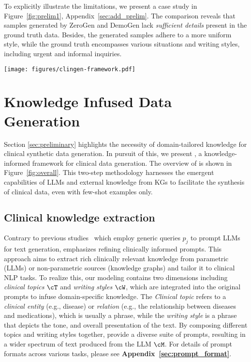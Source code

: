 To explicitly illustrate the limitations, we present a case study in Figure~\ref{fig:prelim1},  Appendix~\ref{sec:add_prelim}. 
The comparison reveals that samples generated by ZeroGen and DemoGen lack  \textit{sufficient details} present in the ground truth data. 
Besides, the generated samples adhere to a more uniform style, while the ground truth encompasses various situations and writing styles, including urgent and informal inquiries.

\begin{figure*}[t]
    \centering
    \texttt{[image: figures/clingen-framework.pdf]}
    \caption{The overview of \ours. \vspace{-2ex}
    }
    \label{fig:overall}
\end{figure*}
\section{Knowledge Infused Data Generation}
Section \ref{sec:preliminary} highlights the necessity of domain-tailored knowledge for clinical synthetic data generation. In pursuit of this, we present {\ours}, a knowledge-informed framework for clinical data generation. The overview of {\ours} is shown in Figure~\ref{fig:overall}. 
This two-step methodology harnesses the emergent capabilities of LLMs and external knowledge from KGs to facilitate the synthesis of clinical data, even with few-shot examples only.  

\subsection{Clinical knowledge extraction}
Contrary to previous studies~\citep{ye2022zerogen,ye2022progen,meng2023tuning} which employ generic queries $p_j$ to prompt LLMs for text generation, {\ours} emphasizes refining clinically informed prompts. This approach aims to extract rich clinically relevant knowledge from parametric (\eg LLMs) or non-parametric sources (\eg knowledge graphs) and tailor it to clinical NLP tasks.
To realize this, our modeling contains two dimensions including \emph{clinical topics} $\cT$ and \emph{writing styles} $\cW$, which are integrated into the original prompts to infuse domain-specific knowledge. 
The \emph{Clinical topic} refers to a \emph{clinical entity} (e.g., disease) or \emph{relation} (e.g., the relationship between diseases and medications), which is usually a phrase, while the \emph{writing style} is a phrase that depicts the tone, and overall presentation of the text.
By composing different topics and writing styles together, {\ours} provide a diverse suite of prompts, resulting in a wider spectrum of text produced from the LLM $\cM$.
For details of prompt formats across various tasks, please see \textbf{Appendix~\ref{sec:prompt_format}}.

